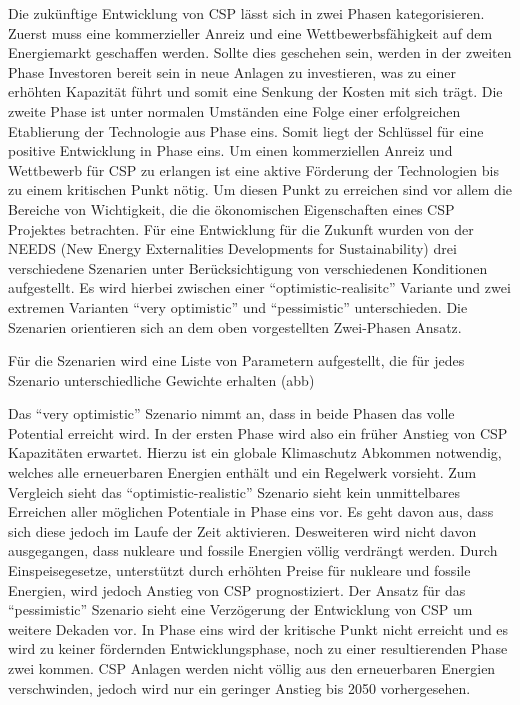 Die zukünftige Entwicklung von CSP lässt sich in zwei Phasen kategorisieren. Zuerst muss eine kommerzieller Anreiz und eine Wettbewerbsfähigkeit auf dem Energiemarkt geschaffen werden. Sollte dies geschehen sein, werden in der zweiten Phase Investoren bereit sein in neue Anlagen zu investieren, was zu einer erhöhten Kapazität führt und somit eine Senkung der Kosten mit sich trägt. Die zweite Phase ist unter normalen Umständen eine Folge einer erfolgreichen Etablierung der Technologie aus Phase eins. Somit liegt der Schlüssel für eine positive Entwicklung in Phase eins. Um einen kommerziellen Anreiz und Wettbewerb für CSP zu erlangen ist eine aktive Förderung der Technologien bis zu einem kritischen Punkt nötig. Um diesen Punkt zu erreichen sind vor allem die Bereiche von Wichtigkeit, die die ökonomischen Eigenschaften eines CSP Projektes betrachten.
Für eine Entwicklung für die Zukunft wurden von der NEEDS (New Energy Externalities Developments for Sustainability) drei verschiedene Szenarien unter Berücksichtigung von verschiedenen Konditionen aufgestellt. Es wird hierbei zwischen einer "`optimistic-realisitc"' Variante und zwei extremen Varianten "`very optimistic"' und "`pessimistic"' unterschieden. Die Szenarien orientieren sich an dem oben vorgestellten Zwei-Phasen Ansatz.

Für die Szenarien wird eine Liste von Parametern aufgestellt, die für jedes Szenario unterschiedliche Gewichte erhalten (abb)

Das "`very optimistic"' Szenario nimmt an, dass in beide Phasen das volle Potential erreicht wird. In der ersten Phase wird also ein früher Anstieg von CSP Kapazitäten erwartet. Hierzu ist ein globale Klimaschutz Abkommen notwendig, welches alle erneuerbaren Energien enthält und ein Regelwerk vorsieht.
Zum Vergleich sieht das "`optimistic-realistic"' Szenario sieht kein unmittelbares Erreichen aller möglichen Potentiale in Phase eins vor. Es geht davon aus, dass sich diese jedoch im Laufe der Zeit aktivieren. Desweiteren wird nicht davon ausgegangen, dass nukleare und fossile Energien völlig verdrängt werden. Durch Einspeisegesetze, unterstützt durch erhöhten Preise für nukleare und fossile Energien, wird jedoch Anstieg von CSP prognostiziert.
Der Ansatz für das "`pessimistic"' Szenario sieht eine Verzögerung der Entwicklung von CSP um weitere Dekaden vor. In Phase eins wird der kritische Punkt nicht erreicht und es wird zu keiner fördernden Entwicklungsphase, noch zu einer resultierenden Phase zwei kommen. CSP Anlagen werden nicht völlig aus den erneuerbaren Energien verschwinden, jedoch wird nur ein geringer Anstieg bis 2050 vorhergesehen.


